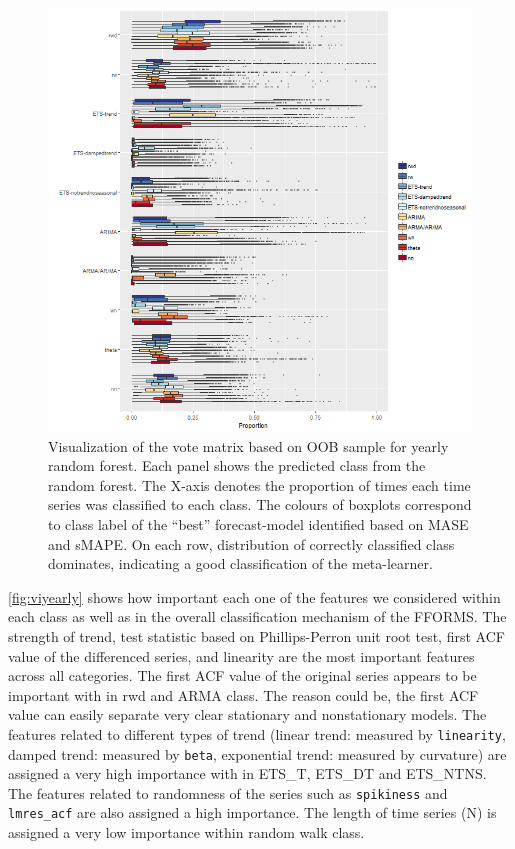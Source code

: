 \documentclass[11pt,a4paper,]{article}
\begin{document}
\begin{figure}
\centering
\includegraphics{figures/yearlyoob-1.png}
\caption{\label{fig:yearlyoob}Visualization of the vote matrix based on OOB
sample for yearly random forest. Each panel shows the predicted class
from the random forest. The X-axis denotes the proportion of times each
time series was classified to each class. The colours of boxplots
correspond to class label of the ``best'' forecast-model identified
based on MASE and sMAPE. On each row, distribution of correctly
classified class dominates, indicating a good classification of the
meta-learner.}
\end{figure}

\autoref{fig:viyearly} shows how important each one of the features we
considered within each class as well as in the overall classification
mechanism of the FFORMS. The strength of trend, test statistic based on
Phillips-Perron unit root test, first ACF value of the differenced
series, and linearity are the most important features across all
categories. The first ACF value of the original series appears to be
important with in rwd and ARMA class. The reason could be, the first ACF
value can easily separate very clear stationary and nonstationary
models. The features related to different types of trend (linear trend:
measured by \texttt{linearity}, damped trend: measured by \texttt{beta},
exponential trend: measured by curvature) are assigned a very high
importance with in ETS\_T, ETS\_DT and ETS\_NTNS. The features related
to randomness of the series such as \texttt{spikiness} and
\texttt{lmres\_acf} are also assigned a high importance. The length of
time series (N) is assigned a very low importance within random walk
class.
\end{document}
